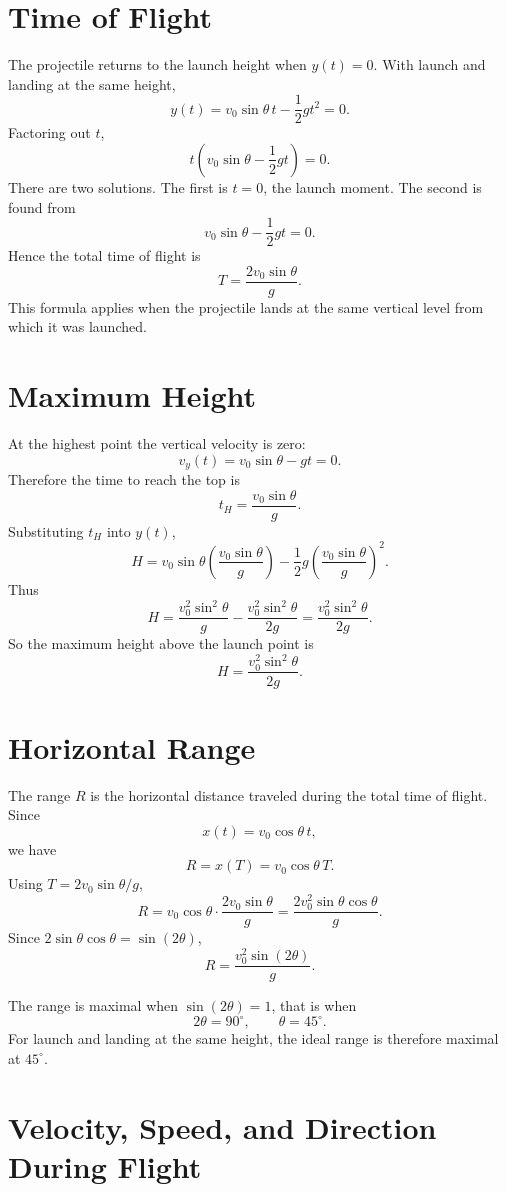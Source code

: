 \section{Time of Flight}

The projectile returns to the launch height when \(y(t)=0\). With launch and
landing at the same height,
\[
y(t)=v_0\sin\theta\,t-\frac{1}{2}gt^2=0.
\]
Factoring out \(t\),
\[
t\left(v_0\sin\theta-\frac{1}{2}gt\right)=0.
\]
There are two solutions. The first is \(t=0\), the launch moment. The second is
found from
\[
v_0\sin\theta-\frac{1}{2}gt=0.
\]
Hence the total time of flight is
\[
\boxed{T=\frac{2v_0\sin\theta}{g}.}
\]
This formula applies when the projectile lands at the same vertical level from
which it was launched.

\section{Maximum Height}

At the highest point the vertical velocity is zero:
\[
v_y(t)=v_0\sin\theta-gt=0.
\]
Therefore the time to reach the top is
\[
\boxed{t_H=\frac{v_0\sin\theta}{g}.}
\]
Substituting \(t_H\) into \(y(t)\),
\[
H=v_0\sin\theta\left(\frac{v_0\sin\theta}{g}\right)
-\frac{1}{2}g\left(\frac{v_0\sin\theta}{g}\right)^2.
\]
Thus
\[
H=\frac{v_0^2\sin^2\theta}{g}-\frac{v_0^2\sin^2\theta}{2g}
=\frac{v_0^2\sin^2\theta}{2g}.
\]
So the maximum height above the launch point is
\[
\boxed{H=\frac{v_0^2\sin^2\theta}{2g}.}
\]

\section{Horizontal Range}

The range \(R\) is the horizontal distance traveled during the total time of
flight. Since
\[
x(t)=v_0\cos\theta\,t,
\]
we have
\[
R=x(T)=v_0\cos\theta\,T.
\]
Using \(T=2v_0\sin\theta/g\),
\[
R=v_0\cos\theta\cdot\frac{2v_0\sin\theta}{g}
=\frac{2v_0^2\sin\theta\cos\theta}{g}.
\]
Since \(2\sin\theta\cos\theta=\sin(2\theta)\),
\[
\boxed{R=\frac{v_0^2\sin(2\theta)}{g}.}
\]

The range is maximal when \(\sin(2\theta)=1\), that is when
\[
2\theta=90^\circ,
\qquad
\theta=45^\circ.
\]
For launch and landing at the same height, the ideal range is therefore maximal
at \(45^\circ\).

\section{Velocity, Speed, and Direction During Flight}

